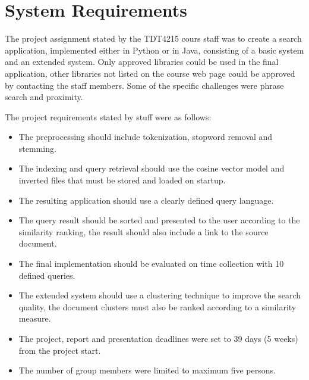 \chapter{System Requirements}
\label{sec:results}
\thispagestyle{fancy}
The project assignment stated by the TDT4215 cours staff was to create a search application, implemented either in Python or in Java, consisting of a basic system and an extended system. Only approved libraries could be used in the final application, other libraries not listed on the course web page could be approved by contacting the staff members. Some of the specific challenges were phrase search and proximity.

The project requirements stated by stuff were as follows:
\begin{itemize}
	\item The preprocessing should include tokenization, stopword removal and stemming.
	\item The indexing and query retrieval should use the cosine vector model and inverted files that must be stored and loaded on startup.
	\item The resulting application should use a clearly defined query language.
	\item The query result should be sorted and presented to the user according to the similarity ranking, the result should also include a link to the source document.
	\item The final implementation should be evaluated on time collection with 10 defined queries.
	\item The extended system should use a clustering technique to improve the search quality, the document clusters must also be ranked according to a similarity measure.
	\item The project, report and presentation deadlines were set to 39 days (5 weeks) from the project start.
	\item The number of group members were limited to maximum five persons.
\end{itemize}